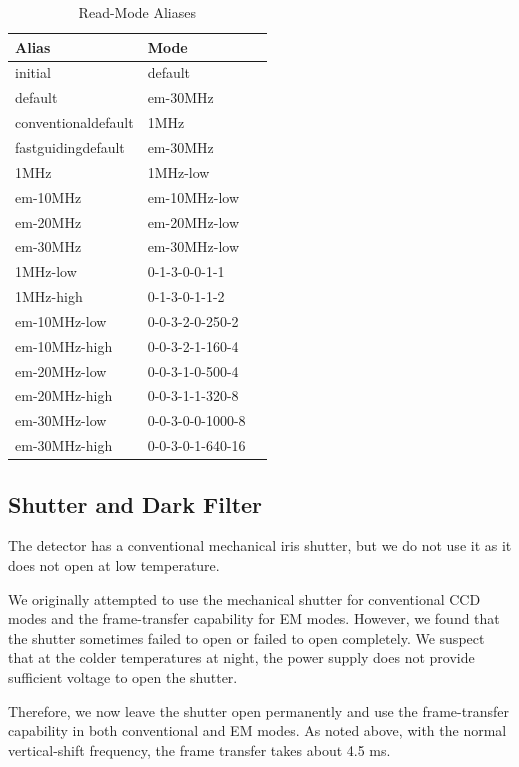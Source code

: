 \begin{table}
\caption{Read-Mode Aliases}
\label{table:huitzi-f8-read-mode-aliases}
\begin{center}
\begin{tabular}{lll}
\hline
Alias&Mode\\
\hline
 initial&default\\
 default&em-30MHz\\
 conventionaldefault&1MHz\\
 fastguidingdefault&em-30MHz\\
 1MHz&1MHz-low\\
 em-10MHz&em-10MHz-low\\
 em-20MHz&em-20MHz-low\\
 em-30MHz&em-30MHz-low\\
 1MHz-low&0-1-3-0-0-1-1\\
 1MHz-high&0-1-3-0-1-1-2\\
 em-10MHz-low&0-0-3-2-0-250-2\\
 em-10MHz-high&0-0-3-2-1-160-4\\
 em-20MHz-low&0-0-3-1-0-500-4\\
 em-20MHz-high&0-0-3-1-1-320-8\\
 em-30MHz-low&0-0-3-0-0-1000-8\\
 em-30MHz-high&0-0-3-0-1-640-16\\
 \hline
\end{tabular}
\end{center}
\end{table}

\subsection{Shutter and Dark Filter}

\label{section:huitzi-f8-shutter}

The detector has a conventional mechanical iris shutter, but we do not use it as it does not open at low temperature.

We originally attempted to use the mechanical shutter for conventional CCD modes and the frame-transfer capability for EM modes. However, we found that the shutter sometimes failed to open or failed to open completely. We suspect that at the colder temperatures at night, the power supply does not provide sufficient voltage to open the shutter. 

Therefore, we now leave the shutter open permanently and use the frame-transfer capability in both conventional and EM modes. As noted above, with the normal vertical-shift frequency, the frame transfer takes about 4.5 ms.

